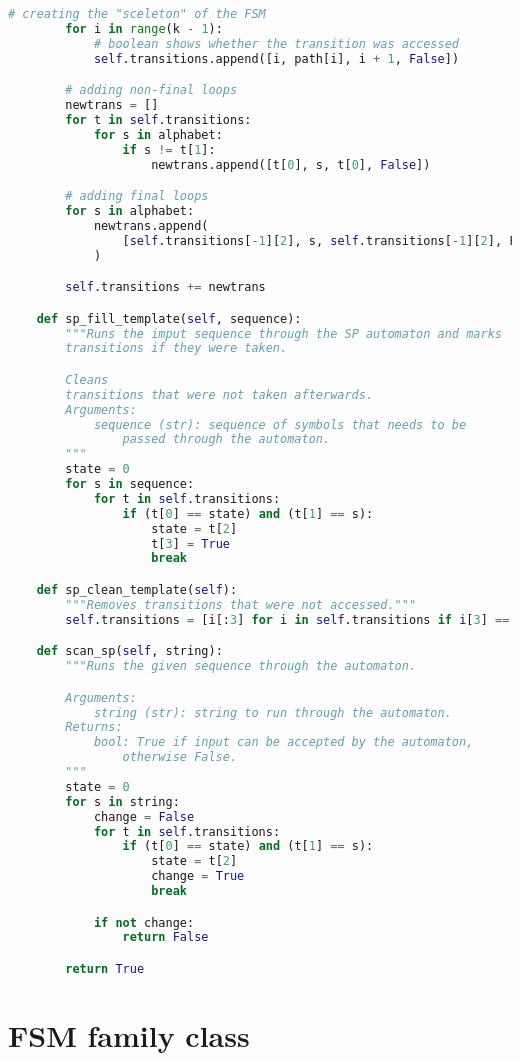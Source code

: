 \begin{lstlisting}[language=Python]
        # creating the "sceleton" of the FSM
        for i in range(k - 1):
            # boolean shows whether the transition was accessed
            self.transitions.append([i, path[i], i + 1, False])

        # adding non-final loops
        newtrans = []
        for t in self.transitions:
            for s in alphabet:
                if s != t[1]:
                    newtrans.append([t[0], s, t[0], False])

        # adding final loops
        for s in alphabet:
            newtrans.append(
                [self.transitions[-1][2], s, self.transitions[-1][2], False]
            )

        self.transitions += newtrans

    def sp_fill_template(self, sequence):
        """Runs the imput sequence through the SP automaton and marks
        transitions if they were taken.

        Cleans
        transitions that were not taken afterwards.
        Arguments:
            sequence (str): sequence of symbols that needs to be
                passed through the automaton.
        """
        state = 0
        for s in sequence:
            for t in self.transitions:
                if (t[0] == state) and (t[1] == s):
                    state = t[2]
                    t[3] = True
                    break

    def sp_clean_template(self):
        """Removes transitions that were not accessed."""
        self.transitions = [i[:3] for i in self.transitions if i[3] == True]

    def scan_sp(self, string):
        """Runs the given sequence through the automaton.

        Arguments:
            string (str): string to run through the automaton.
        Returns:
            bool: True if input can be accepted by the automaton,
                otherwise False.
        """
        state = 0
        for s in string:
            change = False
            for t in self.transitions:
                if (t[0] == state) and (t[1] == s):
                    state = t[2]
                    change = True
                    break

            if not change:
                return False

        return True
\end{lstlisting}

\section{FSM family class}


